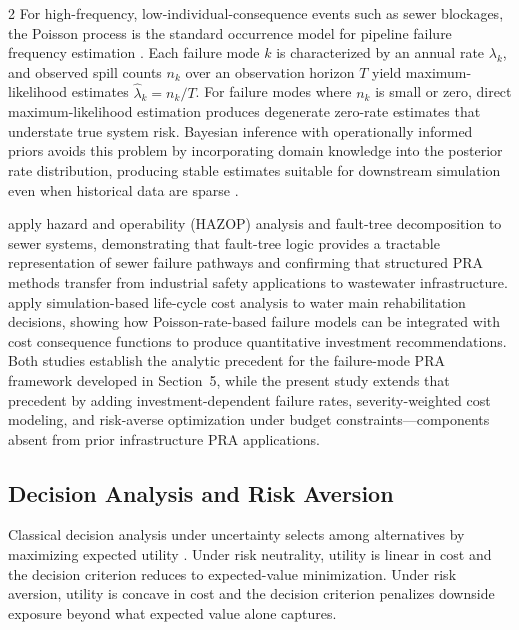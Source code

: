 \documentclass[10pt]{article}
\begin{document}
\begin{multicols}{2}
For high-frequency, low-individual-consequence events such as sewer
blockages, the Poisson process is the standard occurrence model for
pipeline failure frequency estimation \citep{dawotola2013}. Each failure
mode $k$ is characterized by an annual rate $\lambda_k$, and observed
spill counts $n_k$ over an observation horizon $T$ yield
maximum-likelihood estimates $\hat{\lambda}_k = n_k / T$. For failure
modes where $n_k$ is small or zero, direct maximum-likelihood estimation
produces degenerate zero-rate estimates that understate true system risk.
Bayesian inference with operationally informed priors avoids this problem
by incorporating domain knowledge into the posterior rate distribution,
producing stable estimates suitable for downstream simulation even when
historical data are sparse \citep{duchesne2013,foreroortiz2023}.
 
\citet{stanic2012} apply hazard and operability (HAZOP) analysis and
fault-tree decomposition to sewer systems, demonstrating that fault-tree
logic provides a tractable representation of sewer failure pathways and
confirming that structured PRA methods transfer from industrial safety
applications to wastewater infrastructure. \citet{shahata2013} apply
simulation-based life-cycle cost analysis to water main rehabilitation
decisions, showing how Poisson-rate-based failure models can be integrated
with cost consequence functions to produce quantitative investment
recommendations. Both studies establish the analytic precedent for the
failure-mode PRA framework developed in Section~5, while the present study
extends that precedent by adding investment-dependent failure rates,
severity-weighted cost modeling, and risk-averse optimization under budget
constraints---components absent from prior infrastructure PRA applications.
 
\subsection{Decision Analysis and Risk Aversion}
 
Classical decision analysis under uncertainty selects among alternatives
by maximizing expected utility \citep{howard1966,keeney1976}. Under risk
neutrality, utility is linear in cost and the decision criterion reduces
to expected-value minimization. Under risk aversion, utility is concave
in cost and the decision criterion penalizes downside exposure beyond
what expected value alone captures.
 

\end{multicols}
\end{document}
